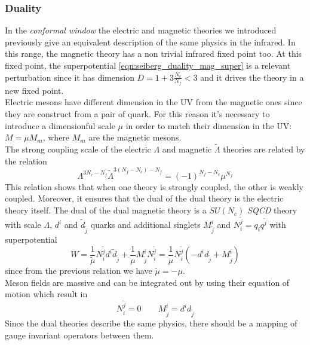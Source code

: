 \subsubsection{Duality}
In the \emph{conformal window} the electric and magnetic theories we introduced previously give an equivalent description of the same physics in the infrared.
In this range, the magnetic theory has a non trivial infrared fixed point too. 
At this fixed point, the superpotential \eqref{eqn:seiberg_duality_mag_super} is a relevant perturbation since it has dimension $D = 1 + 3 \frac{N_c}{N_f}  <3 $ and it drives the theory in a new fixed point.\\
Electric mesons have different dimension in the UV from the magnetic ones since they are construct from a pair of quark.
For this reason it's necessary to introduce a dimensionful scale $\mu$ in order to match their dimension in the UV: $ M = \mu M_m$, where $M_m$ are the magnetic mesons.\\
The strong coupling scale of the electric $\Lambda$ and magnetic $\tilde{\Lambda}$ theories are related by the relation
\begin{equation}
 \Lambda^{3 N_c - N_f} \tilde{\Lambda}^{3 (N_f - N_c) - N_f} = (-1)^{N_f - N_c} \mu^{N_f}
 \label{eqn:seib_dual_matching_scales}
\end{equation}
This relation shows that when one theory is strongly coupled, the other is weakly coupled.
Moreover, it ensures that the dual of the dual theory is the electric theory itself.
The dual of the dual magnetic theory is a $SU(N_c) $ \emph{SQCD} theory with scale $\Lambda$, $d^i$ and $\tilde{d}_{\tilde{j}}$ quarks and additional singlets $M^i_{\tilde{j}}$ and $N^{\tilde{j}}_i= q_i q^{\tilde{j}} $ with superpotential
\begin{equation}
 W = \frac{1}{\tilde{\mu}} N^{\tilde{j}}_i d^i \tilde{d}_{\tilde{j}} + \frac{1}{\mu} M^i_{\tilde{j}} N^{\tilde{j}}_i = \frac{1}{\mu} N^{\tilde{j}}_i \left(  - d^i d_{\tilde{j}}  + M^i_{\tilde{j}}  \right) 
\end{equation}
since from the previous relation we have $\tilde{\mu} = - \mu$.\\
Meson fields are massive and can be integrated out by using their equation of motion which result in
\begin{equation}
 N^{\tilde{j}}_i  = 0 \qquad  M^i_{\tilde{j}} = d^i d_{\tilde{j}}
\end{equation}
Since the dual theories describe the same physics, there should be a mapping of gauge invariant operators between them.
